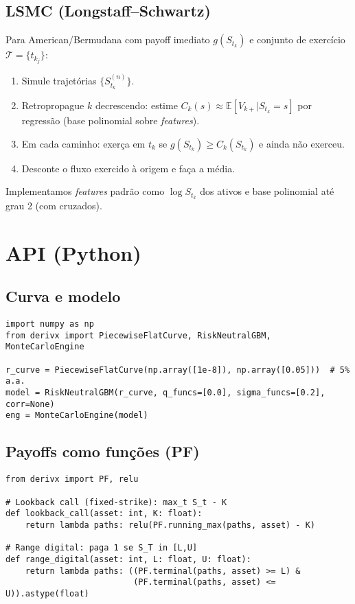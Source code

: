 \documentclass[11pt,a4paper]{article}
\begin{document}
\subsection{LSMC (Longstaff--Schwartz)}
Para American/Bermudana com payoff imediato $g(S_{t_k})$ e conjunto de exercício $\mathcal{T}=\{t_{k_j}\}$:
\begin{enumerate}[nosep]
\item Simule trajetórias $\{S^{(n)}_{t_k}\}$.
\item Retropropague $k$ decrescendo: estime $C_k(s)\approx \mathbb{E}[V_{k{+}}|S_{t_k}=s]$ por regressão (base polinomial sobre \emph{features}).
\item Em cada caminho: exerça em $t_k$ se $g(S_{t_k})\ge C_k(S_{t_k})$ e ainda não exerceu.
\item Desconte o fluxo exercido à origem e faça a média.
\end{enumerate}
Implementamos \emph{features} padrão como $\log S_{t_k}$ dos ativos e base polinomial até grau 2 (com cruzados).

\section{API (Python)}
\subsection{Curva e modelo}
\begin{lstlisting}[style=pystyle]
import numpy as np
from derivx import PiecewiseFlatCurve, RiskNeutralGBM, MonteCarloEngine

r_curve = PiecewiseFlatCurve(np.array([1e-8]), np.array([0.05]))  # 5% a.a.
model = RiskNeutralGBM(r_curve, q_funcs=[0.0], sigma_funcs=[0.2], corr=None)
eng = MonteCarloEngine(model)
\end{lstlisting}

\subsection{Payoffs como funções (PF)}
\begin{lstlisting}[style=pystyle]
from derivx import PF, relu

# Lookback call (fixed-strike): max_t S_t - K
def lookback_call(asset: int, K: float):
    return lambda paths: relu(PF.running_max(paths, asset) - K)

# Range digital: paga 1 se S_T in [L,U]
def range_digital(asset: int, L: float, U: float):
    return lambda paths: ((PF.terminal(paths, asset) >= L) &
                          (PF.terminal(paths, asset) <= U)).astype(float)
\end{lstlisting}
\end{document}
